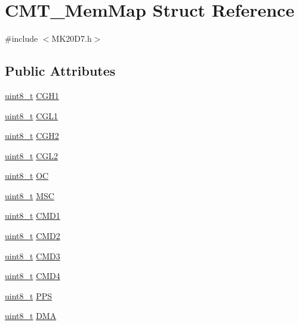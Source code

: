 \hypertarget{struct_c_m_t___mem_map}{}\section{C\+M\+T\+\_\+\+Mem\+Map Struct Reference}
\label{struct_c_m_t___mem_map}


{\ttfamily \#include $<$M\+K20\+D7.\+h$>$}

\subsection*{Public Attributes}
\begin{DoxyCompactItemize}
\item 
\hyperlink{_p_e___types_8h_aba7bc1797add20fe3efdf37ced1182c5}{uint8\+\_\+t} \hyperlink{struct_c_m_t___mem_map_a5efaf7b63ca9b1c492c633304e306dfa}{C\+G\+H1}
\item 
\hyperlink{_p_e___types_8h_aba7bc1797add20fe3efdf37ced1182c5}{uint8\+\_\+t} \hyperlink{struct_c_m_t___mem_map_a3251aaf1799b7c991993412230df664b}{C\+G\+L1}
\item 
\hyperlink{_p_e___types_8h_aba7bc1797add20fe3efdf37ced1182c5}{uint8\+\_\+t} \hyperlink{struct_c_m_t___mem_map_ae61900f68e5537b44f02af4f79a902e4}{C\+G\+H2}
\item 
\hyperlink{_p_e___types_8h_aba7bc1797add20fe3efdf37ced1182c5}{uint8\+\_\+t} \hyperlink{struct_c_m_t___mem_map_ae37d0c89ef9e59676774e958d5e96153}{C\+G\+L2}
\item 
\hyperlink{_p_e___types_8h_aba7bc1797add20fe3efdf37ced1182c5}{uint8\+\_\+t} \hyperlink{struct_c_m_t___mem_map_a67d3243d0c24b20b493fd919433dd84c}{OC}
\item 
\hyperlink{_p_e___types_8h_aba7bc1797add20fe3efdf37ced1182c5}{uint8\+\_\+t} \hyperlink{struct_c_m_t___mem_map_ad1905c6966e1ac635348ce19d5c44ae9}{M\+SC}
\item 
\hyperlink{_p_e___types_8h_aba7bc1797add20fe3efdf37ced1182c5}{uint8\+\_\+t} \hyperlink{struct_c_m_t___mem_map_a6771f22304d3dc09e2c1df31985a1f2a}{C\+M\+D1}
\item 
\hyperlink{_p_e___types_8h_aba7bc1797add20fe3efdf37ced1182c5}{uint8\+\_\+t} \hyperlink{struct_c_m_t___mem_map_a40660a71cbcc2c0a2b0690bf2f8017d3}{C\+M\+D2}
\item 
\hyperlink{_p_e___types_8h_aba7bc1797add20fe3efdf37ced1182c5}{uint8\+\_\+t} \hyperlink{struct_c_m_t___mem_map_a7918a8c8dfb707fc6ac973f26495d20d}{C\+M\+D3}
\item 
\hyperlink{_p_e___types_8h_aba7bc1797add20fe3efdf37ced1182c5}{uint8\+\_\+t} \hyperlink{struct_c_m_t___mem_map_a0e59339adacb7b8a3b1867bb5bf23d0d}{C\+M\+D4}
\item 
\hyperlink{_p_e___types_8h_aba7bc1797add20fe3efdf37ced1182c5}{uint8\+\_\+t} \hyperlink{struct_c_m_t___mem_map_a3a70b1ee9e4f0c56e0b2f48e059e1590}{P\+PS}
\item 
\hyperlink{_p_e___types_8h_aba7bc1797add20fe3efdf37ced1182c5}{uint8\+\_\+t} \hyperlink{struct_c_m_t___mem_map_a3fec559e64d6d6210cbecbbb8368adda}{D\+MA}
\end{DoxyCompactItemize}


